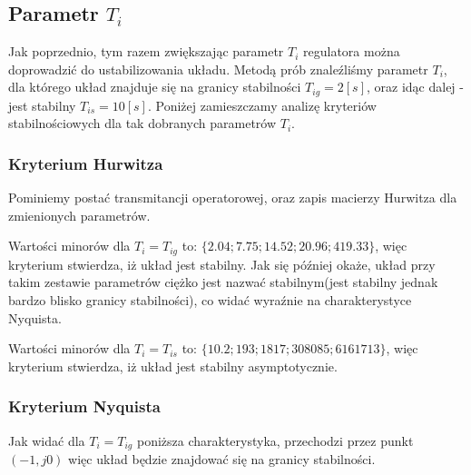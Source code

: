 \documentclass[12pt]{article}
\begin{document}
\newpage

\subsection{Parametr $T_i$}

Jak poprzednio, tym razem zwiększając parametr $T_i$ regulatora
można doprowadzić do ustabilizowania układu. Metodą prób znaleźliśmy parametr
$T_i$, dla którego układ znajduje się na granicy stabilności $T_{ig}=2[s]$, oraz
idąc dalej - jest stabilny $T_{is}=10[s]$. Poniżej zamieszczamy analizę
kryteriów stabilnościowych dla tak dobranych parametrów $T_i$.

\subsubsection{Kryterium Hurwitza}

Pominiemy postać transmitancji operatorowej, oraz zapis macierzy Hurwitza dla
zmienionych parametrów.

Wartości minorów dla $T_{i}=T_{ig}$ to: $\{2.04;7.75;14.52;20.96;419.33\}$,
więc kryterium stwierdza, iż układ jest stabilny. Jak się później okaże, układ
przy takim zestawie parametrów ciężko jest nazwać stabilnym(jest stabilny
jednak bardzo blisko granicy stabilności), co widać wyraźnie na charakterystyce
Nyquista.

Wartości minorów dla $T_{i}=T_{is}$ to: $\{10.2;193;1817;308085;6161713\}$,
więc kryterium stwierdza, iż układ jest stabilny asymptotycznie.

\subsubsection{Kryterium Nyquista}

Jak widać dla $T_{i}=T_{ig}$ poniższa charakterystyka, przechodzi przez punkt
$(-1, j0)$ więc układ będzie znajdować się na granicy stabilności.
\end{document}
